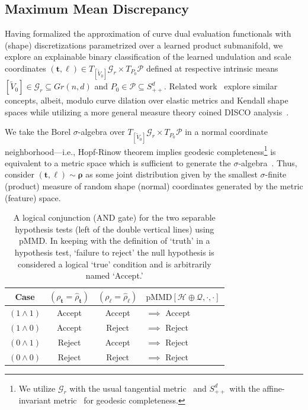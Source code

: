 \documentclass[pdflatex,iicol]{sn-jnl}%
\theoremstyle{thmstyleone}%
\theoremstyle{thmstyletwo}%
\theoremstyle{thmstylethree}%
\begin{document}
\subsection{Maximum Mean Discrepancy} \label{subsec:MMD}
Having formalized the approximation of curve dual evaluation functionals with (shape) discretizations parametrized over a learned product submanifold, we explore an explainable binary classification of the learned undulation and scale coordinates $(\boldsymbol{t},\boldsymbol{\ell}) \in T_{[\widetilde{V}_0]}\mathcal{G}_r \times T_{P_0}\mathcal{P}$ defined at respective intrinsic means $[\widetilde{V}_0] \in \mathcal{G}_r\subseteq Gr(n,d)$ and $P_0 \in \mathcal{P}\subseteq S^d_{++}$. Related work~\cite{zhang2022nonparametric} explore similar concepts, albeit, modulo curve dilation over elastic metrics and Kendall shape spaces while utilizing a more general measure theory coined DISCO analysis~\cite{RizzoDISCO2010}. 

We take the Borel $\sigma$-algebra over $T_{[\widetilde{V}_0]}\mathcal{G}_r \times T_{P_0}\mathcal{P}$ in a normal coordinate neighborhood---i.e., Hopf-Rinow theorem implies geodesic completeness\footnote{We utilize $\mathcal{G}_r$ with the usual tangential metric~\cite{edelman1998geometry,bendokat2020grassmann} and $S^d_{++}$ with the affine-invariant metric~\cite{fletcher2003statistics,pennec2020manifold} for geodesic completeness.} is equivalent to a metric space which is sufficient to generate the $\sigma$-algebra~\cite{pennec1999probabilities}. Thus, consider $(\boldsymbol{t}, \boldsymbol{\ell}) \sim \boldsymbol{\rho}$ as some joint distribution given by the smallest $\sigma$-finite (product) measure of random shape (normal) coordinates generated by the metric (feature) space.

\begin{table}
    \centering
    \begin{tabular}{c|c|c||l}
        {Case} &
        $(\rho_{\boldsymbol{t}}=\widehat{\rho}_{\boldsymbol{t}})$ & 
        $(\rho_{\boldsymbol{\ell}}=\widehat{\rho}_{\boldsymbol{\ell}})$ & $\text{pMMD}[\mathcal{H} \oplus \mathcal{Q},\cdot,\cdot]$ \\
        \hline
        $(1 \wedge 1)$ &
        Accept & Accept & $\implies$ Accept\\
        $(1 \wedge 0)$ &
        Accept & Reject & $\implies$ Reject \\
        $(0 \wedge 1)$ &
        Reject & Accept & $\implies$ Reject \\
        $(0 \wedge 0)$ &
        Reject & Reject & $\implies$ Reject \\
    \end{tabular}
    \caption{A logical conjunction (AND gate) for the two separable hypothesis tests (left of the double vertical lines) using pMMD. In keeping with the definition of `truth' in a hypothesis test, `failure to reject' the null hypothesis is considered a logical `true' condition and is arbitrarily named `Accept.'}
    \label{tab:logical_conjunction}
\end{table}
\end{document}
